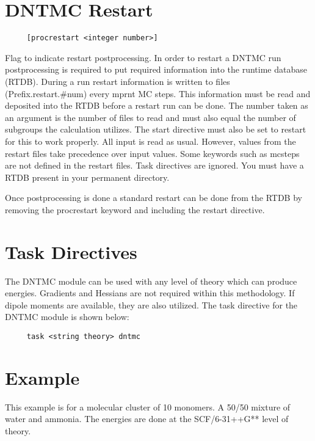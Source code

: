 \section{DNTMC Restart}

\begin{verbatim}
     [procrestart <integer number>]
\end{verbatim}
Flag to indicate restart postprocessing.  In order to restart a
DNTMC run postprocessing is required to put required information
into the runtime database (RTDB).  During a run restart information
is written to files (Prefix.restart.\#num) every mprnt MC steps.
This information must be read and deposited into the RTDB before a
restart run can be done.  The number taken as an argument is the
number of files to read and must also equal the number of subgroups
the calculation utilizes.  The start directive must also be set to
restart for this to work properly.  All input is read as usual.
However, values from the restart files take precedence over input
values. Some keywords such as mcsteps are not defined in the restart
files.  Task directives are ignored. You must have a RTDB present in
your permanent directory.

Once postprocessing is done a standard restart can be done from the
RTDB by removing the procrestart keyword and including the restart
directive.

\section{Task Directives}
The DNTMC module can be used with any level of theory which can
produce energies.  Gradients and Hessians are not required within
this methodology.  If dipole moments are available, they are also
utilized.  The task directive for the DNTMC module is shown below:
\begin{verbatim}
     task <string theory> dntmc
\end{verbatim}

\section{Example}
This example is for a molecular cluster of 10 monomers.  A 50/50
mixture of water and ammonia.  The energies are done at the
SCF/6-31++G** level of theory.

